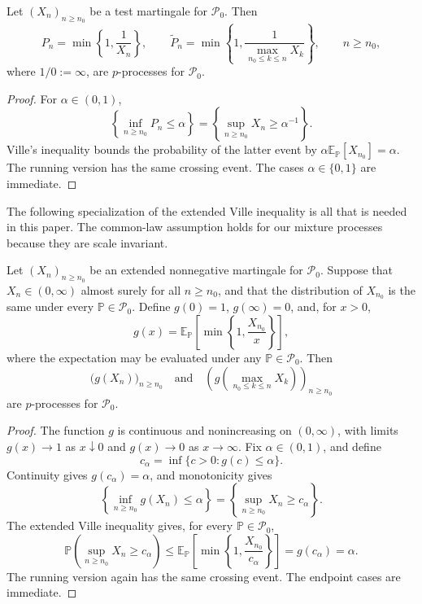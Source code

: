 \begin{proposition}
\label{prop:ville-calibration}
Let \((X_n)_{n\geq n_0}\) be a test martingale for \(\mathcal P_0\).
Then
\[
  P_n
  =
  \min\left\{1,\frac1{X_n}\right\},
  \qquad
  \widetilde P_n
  =
  \min\left\{
    1,
    \frac1{\max_{n_0\leq k\leq n}X_k}
  \right\},
  \qquad n\geq n_0,
\]
where \(1/0:=\infty\), are \(p\)-processes for \(\mathcal P_0\).
\end{proposition}

\begin{proof}
For \(\alpha\in(0,1)\),
\[
  \left\{\inf_{n\geq n_0}P_n\leq\alpha\right\}
  =
  \left\{\sup_{n\geq n_0}X_n\geq\alpha^{-1}\right\}.
\]
Ville's inequality bounds the probability of the latter event by
\(\alpha\mathbb E_{\mathbb P}[X_{n_0}]=\alpha\). The running version
has the same crossing event. The cases \(\alpha\in\{0,1\}\) are
immediate.
\end{proof}

The following specialization of the extended Ville inequality is all
that is needed in this paper. The common-law assumption holds for our
mixture processes because they are scale invariant.

\begin{proposition}
\label{prop:extended-ville-calibration}
Let \((X_n)_{n\geq n_0}\) be an extended nonnegative martingale for
\(\mathcal P_0\). Suppose that \(X_n\in(0,\infty)\) almost surely for
all \(n\geq n_0\), and that the distribution of \(X_{n_0}\) is the
same under every \(\mathbb P\in\mathcal P_0\). Define \(g(0)=1\), \(g(\infty)=0\), and,
for \(x>0\),
\[
  g(x)
  =
  \mathbb E_{\mathbb P}
  \left[
    \min\left\{1,\frac{X_{n_0}}{x}\right\}
  \right],
\]
where the expectation may be evaluated under any
\(\mathbb P\in\mathcal P_0\). Then
\[
  \bigl(g(X_n)\bigr)_{n\geq n_0}
  \quad\text{and}\quad
  \left(
    g\left(\max_{n_0\leq k\leq n}X_k\right)
  \right)_{n\geq n_0}
\]
are \(p\)-processes for \(\mathcal P_0\).
\end{proposition}

\begin{proof}
The function \(g\) is continuous and nonincreasing on \((0,\infty)\),
with limits \(g(x)\to1\) as \(x\downarrow0\) and \(g(x)\to0\) as
\(x\to\infty\). Fix \(\alpha\in(0,1)\), and define
\[
  c_\alpha
  =
  \inf\{c>0:g(c)\leq\alpha\}.
\]
Continuity gives \(g(c_\alpha)=\alpha\), and monotonicity gives
\[
  \left\{\inf_{n\geq n_0}g(X_n)\leq\alpha\right\}
  =
  \left\{\sup_{n\geq n_0}X_n\geq c_\alpha\right\}.
\]
The extended Ville inequality \citep{Wang2025a} gives, for every
\(\mathbb P\in\mathcal P_0\),
\[
  \mathbb P\left(\sup_{n\geq n_0}X_n\geq c_\alpha\right)
  \leq
  \mathbb E_{\mathbb P}
  \left[
    \min\left\{1,\frac{X_{n_0}}{c_\alpha}\right\}
  \right]
  =g(c_\alpha)
  =\alpha.
\]
The running version again has the same crossing event. The endpoint
cases are immediate.
\end{proof}

